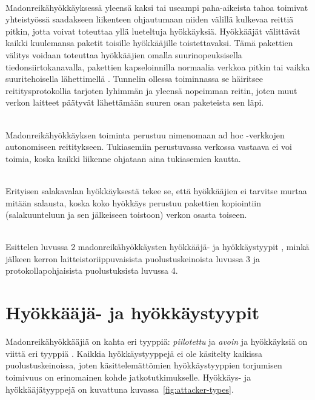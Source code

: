 \documentclass[finnish]{tktltiki2}
\theoremstyle{definition}
\theoremstyle{remark}
\begin{document}
\noindent \\
Madonreikähyökkäyksessä yleensä kaksi tai useampi paha-aikeista tahoa toimivat yhteistyössä saadakseen liikenteen ohjautumaan niiden välillä kulkevaa reittiä pitkin, jotta voivat toteuttaa yllä lueteltuja hyökkäyksiä. Hyökkääjät välittävät kaikki kuulemansa paketit toisille hyökkääjille toistettavaksi. Tämä pakettien välitys voidaan toteuttaa hyökkääjien omalla suurinopeuksisella tiedonsiirtokanavalla, pakettien kapseloinnilla normaalia verkkoa pitkin tai vaikka suuritehoisella lähettimellä \cite{liteworp}. Tunnelin ollessa toiminnassa se häiritsee reititysprotokollia tarjoten lyhimmän ja yleensä nopeimman reitin, joten muut verkon laitteet päätyvät lähettämään suuren osan paketeista sen läpi. 

\noindent \\
Madonreikähyökkäyksen toiminta perustuu nimenomaan ad hoc -verkkojen autonomiseen reititykseen. Tukiasemiin perustuvassa verkossa vastaava ei voi toimia, koska kaikki liikenne ohjataan aina tukiasemien kautta.

\noindent \\
Erityisen salakavalan hyökkäyksestä tekee se, että hyökkääjien ei tarvitse murtaa mitään salausta, koska koko hyökkäys perustuu pakettien kopiointiin (salakuunteluun ja sen jälkeiseen toistoon) verkon osasta toiseen.

\noindent \\
Esittelen luvussa 2 madonreikähyökkäysten hyökkääjä- \cite{delphi} ja hyökkäystyypit \cite{liteworp}, minkä jälkeen kerron laitteistoriippuvaisista puolustuskeinoista luvussa 3 ja protokollapohjaisista puolustuksista luvussa 4.

% 
% 
% 
% 
% 
% 
\section{Hyökkääjä- ja hyökkäystyypit}
% 
% 
% 
% 
% 
% 
% 
% 
% 
% 

Madonreikähyökkääjiä on kahta eri tyyppiä: \emph{piilotettu} ja \emph{avoin} \cite{delphi} ja hyökkäyksiä on viittä eri tyyppiä \cite{liteworp}. Kaikkia hyökkäystyyppejä ei ole käsitelty kaikissa puolustuskeinoissa, joten käsittelemättömien hyökkäystyyppien torjumisen toimivuus on erinomainen kohde jatkotutkimukselle. Hyökkäys- ja hyökkääjätyyppejä on kuvattuna kuvassa~\ref{fig:attacker-types}.
\end{document}
